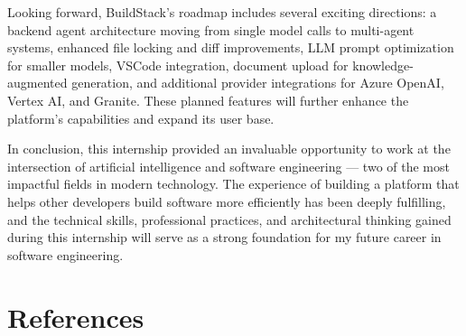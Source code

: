 \documentclass[12pt,a4paper,openany]{report}
\begin{document}
Looking forward, BuildStack's roadmap includes several exciting directions: a backend agent architecture moving from single model calls to multi-agent systems, enhanced file locking and diff improvements, LLM prompt optimization for smaller models, VSCode integration, document upload for knowledge-augmented generation, and additional provider integrations for Azure OpenAI, Vertex AI, and Granite. These planned features will further enhance the platform's capabilities and expand its user base.

In conclusion, this internship provided an invaluable opportunity to work at the intersection of artificial intelligence and software engineering --- two of the most impactful fields in modern technology. The experience of building a platform that helps other developers build software more efficiently has been deeply fulfilling, and the technical skills, professional practices, and architectural thinking gained during this internship will serve as a strong foundation for my future career in software engineering.

\newpage
\chapter*{References}
\end{document}
